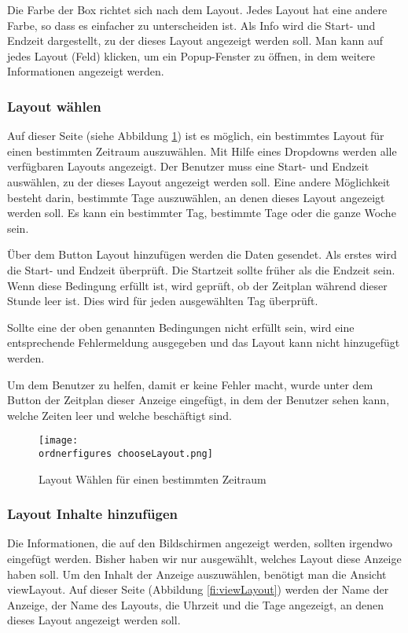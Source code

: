 Die Farbe der Box richtet sich nach dem Layout. Jedes Layout hat eine andere Farbe, so dass es einfacher zu unterscheiden ist.
Als Info wird die Start- und Endzeit dargestellt, zu der dieses Layout angezeigt werden soll. 
Man kann auf jedes Layout (Feld) klicken, um ein Popup-Fenster zu öffnen, in dem weitere Informationen angezeigt werden.

\subsubsection{Layout wählen}

Auf dieser Seite (siehe Abbildung \ref{fi:chooseLayout}) ist es möglich, ein bestimmtes Layout für einen bestimmten Zeitraum auszuwählen. Mit Hilfe eines Dropdowns werden alle verfügbaren Layouts angezeigt. Der Benutzer muss eine Start- und Endzeit auswählen, zu der dieses Layout angezeigt werden soll. Eine andere Möglichkeit besteht darin, bestimmte Tage auszuwählen, an denen dieses Layout angezeigt werden soll. Es kann ein bestimmter Tag, bestimmte Tage oder die ganze Woche sein.

Über dem Button Layout hinzufügen werden die Daten gesendet. Als erstes wird die Start- und Endzeit überprüft. Die Startzeit sollte früher als die Endzeit sein. Wenn diese Bedingung erfüllt ist, wird geprüft, ob der Zeitplan während dieser Stunde leer ist. Dies wird für jeden ausgewählten Tag überprüft.

Sollte eine der oben genannten Bedingungen nicht erfüllt sein, wird eine entsprechende Fehlermeldung ausgegeben und das Layout kann nicht hinzugefügt werden.

Um dem Benutzer zu helfen, damit er keine Fehler macht, wurde unter dem Button der Zeitplan 
dieser Anzeige eingefügt, in dem der Benutzer sehen kann, welche Zeiten leer und welche beschäftigt sind.

\begin{figure}[H]
	\centering
	\texttt{[image: \\ordnerfigures chooseLayout.png]}
	\caption{Layout Wählen für einen bestimmten Zeitraum}
	\label{fi:chooseLayout}
\end{figure}

\subsubsection{Layout Inhalte hinzufügen}
Die Informationen, die auf den Bildschirmen angezeigt werden, sollten irgendwo eingefügt werden. Bisher haben wir nur ausgewählt, welches Layout diese Anzeige haben soll.
Um den Inhalt der Anzeige auszuwählen, benötigt man die Ansicht viewLayout. Auf dieser Seite (Abbildung \ref{fi:viewLayout}) werden der Name der Anzeige, der Name des Layouts, die Uhrzeit und die Tage angezeigt, an denen dieses Layout angezeigt werden soll.

